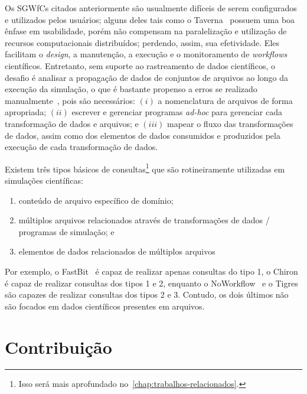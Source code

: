 Os SGWfCs citados anteriormente são usualmente difíceis de serem configurados e utilizados pelos usuários; alguns deles tais como o Taverna~\cite{hull2006taverna} possuem uma boa ênfase em usabilidade, porém não compensam na paralelização e utilização de recursos computacionais distribuídos; perdendo, assim, sua efetividade.
Eles facilitam o \textit{design}, a manutenção, a execução e o monitoramento de \textit{workflows} científicos. Entretanto, sem suporte ao rastreamento de dados científicos, o desafio é analisar a propagação de dados de conjuntos de arquivos ao longo da execução da simulação, o que é bastante propenso a erros se realizado manualmente~\cite{silva2015analyzing}, pois são necessários: \( (i) \) a nomenclatura de arquivos de forma apropriada; \( (ii) \) escrever e gerenciar programas \textit{ad-hoc} para gerenciar cada transformação de dados e arquivos; e \( (iii) \) mapear o fluxo das transformações de dados, assim como dos elementos de dados consumidos e produzidos pela execução de cada transformação de dados.

Existem três tipos básicos de consultas\footnote{Isso será mais aprofundado no~\autoref{chap:trabalhos-relacionados}.} que são rotineiramente utilizadas em simulações científicas:

\begin{enumerate}
    \item conteúdo de arquivo específico de domínio;
    \item múltiplos arquivos relacionados através de transformações de dados / programas de simulação; e
    \item elementos de dados relacionados de múltiplos arquivos
\end{enumerate}

Por exemplo, o FastBit~\cite{wu2009fastbit} é capaz de realizar apenas consultas do tipo 1, o Chiron~\cite{ogasawara2013chiron} é capaz de realizar consultas dos tipos 1 e 2, enquanto o NoWorkflow~\cite{murta2014noworkflow} e o Tigres~\cite{hendrix2016tigres} são capazes de realizar consultas dos tipos 2 e 3. Contudo, os dois últimos não são focados em dados científicos presentes em arquivos.

\section{Contribuição}

